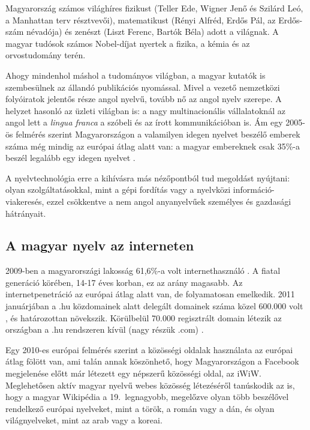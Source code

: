 \begin{multicols}{2}
  Magyarország számos világhíres fizikust (Teller Ede, Wigner Jenő és Szilárd Leó, a Manhattan terv résztvevői), ma\-te\-ma\-ti\-kust (Rényi Alfréd, Erdős Pál, az Erdős-szám névadója) és zenészt (Liszt Ferenc, Bartók Béla) adott a világnak. A ma\-gyar tudósok számos Nobel-díjat nyertek a fizika, a kémia és az orvostudomány terén.

  Ahogy mindenhol máshol a tudományos világban, a magyar kutatók is szembesülnek az állandó publikációs nyomással. Mivel a vezető nemzetközi folyóiratok jelentős része angol nyelvű, tovább nő az angol nyelv szerepe. A helyzet hasonló az üzleti világban is: a nagy multinacionális vállalatoknál az angol lett a \textit{lingua franca} a szóbeli és az írott kommunikációban is. Ám egy 2005-ös felmérés szerint  Ma\-gyar\-or\-szá\-gon a valamilyen idegen nyelvet beszélő emberek száma még mindig az európai átlag alatt van: a magyar embereknek csak 35\%-a beszél legalább egy idegen nyelvet \cite{tarki}. 

  A nyelvtechnológia erre a kihívásra más nézőpontból tud megoldást nyújtani: olyan szolgáltatásokkal, mint a gépi fordítás vagy a nyelvközi információ-viakeresés, ezzel csökkentve a nem angol anya\-nyel\-vű\-ek személyes és gazdasági hátrányait. 

  \subsection{A magyar nyelv az interneten}

  2009-ben a magyarországi lakosság 61,6\%-a volt internethasználó \cite{internet}. A fiatal ge\-ne\-rá\-ció körében, 14-17 éves korban, ez az arány magasabb. Az internetpenetráció az európai átlag alatt van, de fo\-lya\-ma\-to\-san emelkedik. 2011 januárjában a .hu közdomainek alatt delegált domainek száma közel 600.000 volt \cite{domain}, és határozottan növekszik. Körülbelül 70.000 re\-giszt\-rált domain létezik az országban a .hu rendszeren kívül (nagy részük .com) \cite{com}.  


  Egy 2010-es európai felmérés szerint a közösségi oldalak használata az európai átlag fölött van, ami talán annak köszönhető, hogy Magyarországon a Facebook megjelenése előtt már létezett egy népszerű közösségi oldal, az iWiW. Meglehetősen aktív magyar nyelvű webes közösség létezéséről tanúskodik az is, hogy a magyar Wikipédia a 19.\ leg\-na\-gyobb, megelőzve olyan több beszélővel rendelkező európai nyelveket, mint a török, a román vagy a dán, és olyan világnyelveket, mint az arab vagy a koreai. 


\end{multicols}

